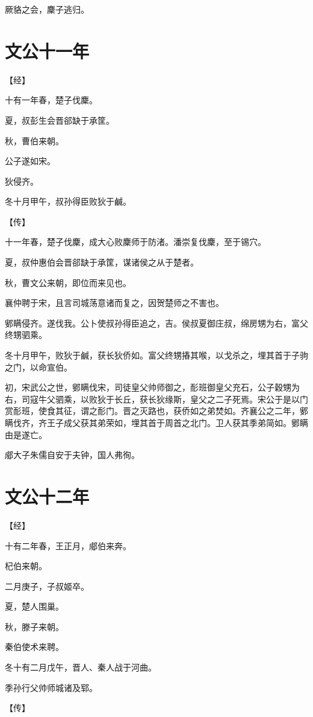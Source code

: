 \documentclass[a4paper,12pt,UTF8,twoside]{ctexbook}
\begin{document}
厥貉之会，麇子逃归。


\chapter{文公十一年}


【经】

十有一年春，楚子伐麇。

夏，叔彭生会晋郤缺于承筐。

秋，曹伯来朝。

公子遂如宋。

狄侵齐。

冬十月甲午，叔孙得臣败狄于鹹。

【传】

十一年春，楚子伐麇，成大心败麇师于防渚。潘崇复伐麇，至于锡穴。

夏，叔仲惠伯会晋郤缺于承筐，谋诸侯之从于楚者。

秋，曹文公来朝，即位而来见也。

襄仲聘于宋，且言司城荡意诸而复之，因贺楚师之不害也。

鄋瞒侵齐。遂伐我。公卜使叔孙得臣追之，吉。侯叔夏御庄叔，绵房甥为右，富父终甥驷乘。



冬十月甲午，败狄于鹹，获长狄侨如。富父终甥摏其喉，以戈杀之，埋其首于子驹之门，以命宣伯。

初，宋武公之世，鄋瞒伐宋，司徒皇父帅师御之，耏班御皇父充石，公子穀甥为右，司寇牛父驷乘，以败狄于长丘，获长狄缘斯，皇父之二子死焉。宋公于是以门赏耏班，使食其征，谓之耏门。晋之灭路也，获侨如之弟焚如。齐襄公之二年，鄋瞒伐齐，齐王子成父获其弟荣如，埋其首于周首之北门。卫人获其季弟简如。鄋瞒由是遂亡。

郕大子朱儒自安于夫钟，国人弗徇。

\chapter{文公十二年}


【经】

十有二年春，王正月，郕伯来奔。

杞伯来朝。

二月庚子，子叔姬卒。

夏，楚人围巢。

秋，滕子来朝。

秦伯使术来聘。

冬十有二月戊午，晋人、秦人战于河曲。

季孙行父帅师城诸及郓。

【传】
\end{document}
